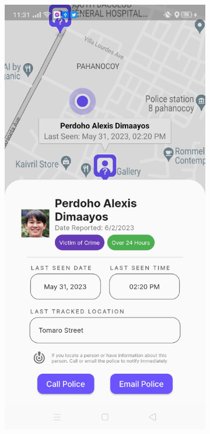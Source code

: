 \begin{figure}[!h]
    \centering
    \begin{subfigure}[c]{0.30\linewidth}
        \centering
        \includegraphics[scale=0.15]{figures/Chapter4/Main/NearbyMP-1.jpg}

\end{subfigure}
\end{figure}
